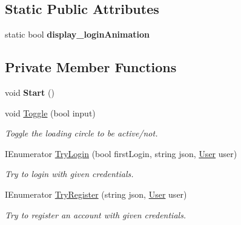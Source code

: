 \subsection*{Static Public Attributes}
\begin{DoxyCompactItemize}
\item 
\mbox{\label{class_authenticate_user_abb9961dab19aac74a73ca4fb1b9e60a6}} 
static bool {\bfseries display\+\_\+login\+Animation}
\end{DoxyCompactItemize}
\subsection*{Private Member Functions}
\begin{DoxyCompactItemize}
\item 
\mbox{\label{class_authenticate_user_a2fede13427963bbcdd6a7d09a6846f3a}} 
void {\bfseries Start} ()
\item 
\mbox{\label{class_authenticate_user_a58d5801c4d4ea321321ae7729a17ef7f}} 
void \mbox{\hyperlink{class_authenticate_user_a58d5801c4d4ea321321ae7729a17ef7f}{Toggle}} (bool input)
\begin{DoxyCompactList}\small\item\em Toggle the loading circle to be active/not. \end{DoxyCompactList}\item 
\mbox{\label{class_authenticate_user_a7c2cb46ec083bb2474c6decf4f165773}} 
I\+Enumerator \mbox{\hyperlink{class_authenticate_user_a7c2cb46ec083bb2474c6decf4f165773}{Try\+Login}} (bool first\+Login, string json, \mbox{\hyperlink{class_user}{User}} user)
\begin{DoxyCompactList}\small\item\em Try to login with given credentials. \end{DoxyCompactList}\item 
\mbox{\label{class_authenticate_user_a1243f9482a71212db33a555534a1bc97}} 
I\+Enumerator \mbox{\hyperlink{class_authenticate_user_a1243f9482a71212db33a555534a1bc97}{Try\+Register}} (string json, \mbox{\hyperlink{class_user}{User}} user)
\begin{DoxyCompactList}\small\item\em Try to register an account with given credentials. \end{DoxyCompactList}\end{DoxyCompactItemize}


